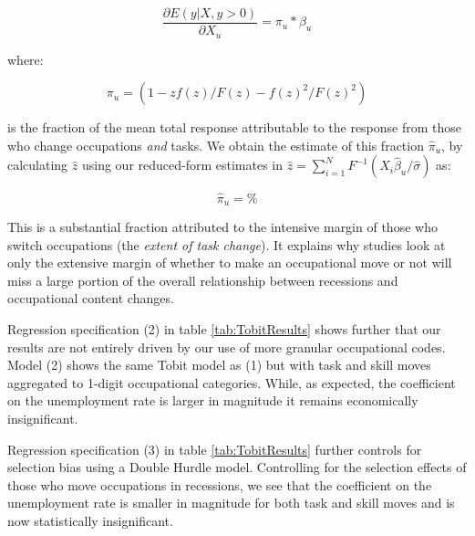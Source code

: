 \documentclass[11pt, oneside]{article}
\begin{document}
\begin{equation}
\frac{\partial E(y|X, y>0)}{\partial X_{u}}=\pi_{u}*\beta_{u}
\end{equation}

\noindent where:

\begin{equation*}
\label{eqn:fracMeanResponse}
\pi_{u} = (1- zf( z)/F( z) - f( z)^2/F( z)^2)
\end{equation*}

\noindent  is the fraction of the mean total response attributable to the response from those who change occupations \textit{and} tasks. We obtain the estimate of this fraction $\hat{\pi}_{u}$,  by calculating $\hat{z}$ using our reduced-form estimates in $\hat{z}= \sum_{i=1}^N F^{-1}(X_i \hat{\beta}_{u}/ \hat{\sigma})$ as:

\begin{equation*}
\label{eqn:fracMeanResponseequals}
\hat{\pi}_{u} =  \%
\end{equation*}

This is a substantial fraction attributed to the intensive margin of those who switch occupations (the \textit{extent of task change}). It explains why studies look at only the extensive margin of whether to make an occupational move or not will miss a large portion of the overall relationship between recessions and occupational content changes.

\vspace{2mm}

Regression specification (2) in table \ref{tab:TobitResults} shows further that our results are not entirely driven by our use of more granular occupational codes. Model (2) shows the same Tobit model as (1) but with task and skill moves aggregated to 1-digit occupational categories. While,  as expected, the coefficient on the unemployment rate is larger in magnitude  it remains economically insignificant.

\vspace{2mm}

Regression specification (3) in table \ref{tab:TobitResults} further controls for selection bias using a Double Hurdle model. Controlling for the selection effects of those who move occupations in recessions, we see that the coefficient on the unemployment rate is smaller in magnitude for both task and skill moves and is now statistically insignificant.




\vspace{2mm}
\end{document}
